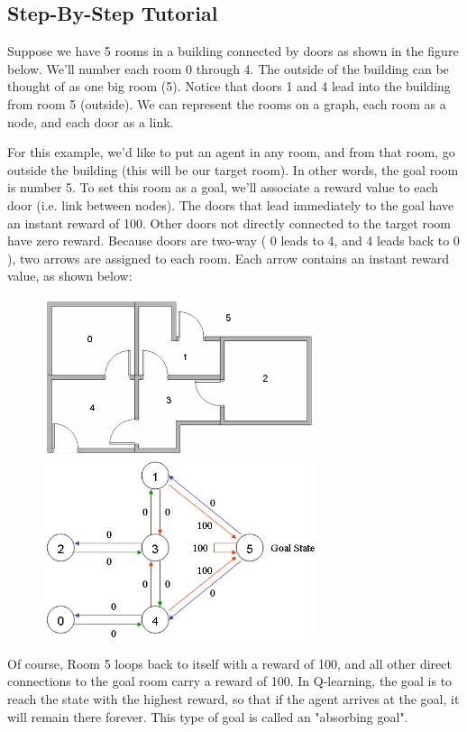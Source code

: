 \documentclass[a4paper, 11pt]{article}
\begin{document}
\subsection{Step-By-Step Tutorial}
Suppose we have 5 rooms in a building connected by doors as shown in the figure below.  We'll number each room 0 through 4.  The outside of the building can be thought of as one big room (5).  Notice that doors 1 and 4 lead into the building from room 5 (outside). We can represent the rooms on a graph, each room as a node, and each door as a link. 


For this example, we'd like to put an agent in any room, and from that room, go outside the building (this will be our target room). In other words, the goal room is number 5. To set this room as a goal, we'll associate a reward value to each door (i.e. link between nodes). The doors that lead immediately to the goal have an instant reward of 100.  Other doors not directly connected to the target room have zero reward. Because doors are two-way ( 0 leads to 4, and 4 leads back to 0 ), two arrows are assigned to each room. Each arrow contains an instant reward value, as shown below:

\begin{figure}[ht]
\centering
\includegraphics[width=8cm]{Pic/modeling_environment_clip_image002a}
\quad
\includegraphics[width=8cm]{Pic/map2a}
\end{figure}

Of course, Room 5 loops back to itself with a reward of 100, and all other direct connections to the goal room carry a reward of 100.  In Q-learning, the goal is to reach the state with the highest reward, so that if the agent arrives at the goal, it will remain there forever. This type of goal is called an "absorbing goal".
\end{document}
